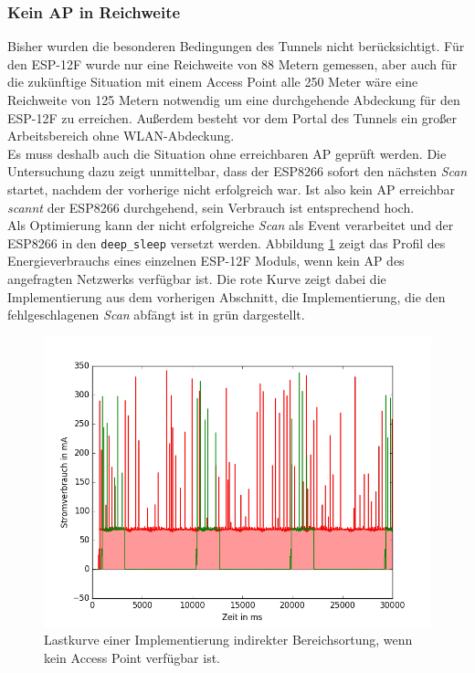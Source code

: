 \subsubsection{Kein AP in Reichweite}
Bisher wurden die besonderen Bedingungen des Tunnels nicht berücksichtigt.
Für den ESP-12F wurde nur eine Reichweite von 88 Metern gemessen, aber auch für die zukünftige Situation mit einem Access Point alle 250 Meter wäre eine Reichweite von 125 Metern notwendig um eine durchgehende Abdeckung für den ESP-12F zu erreichen.
Außerdem besteht vor dem Portal des Tunnels ein großer Arbeitsbereich ohne WLAN-Abdeckung.\\
Es muss deshalb auch die Situation ohne erreichbaren AP geprüft werden.
Die Untersuchung dazu zeigt unmittelbar, dass der ESP8266 sofort den nächsten \emph{Scan} startet, nachdem der vorherige nicht erfolgreich war.
Ist also kein AP erreichbar \emph{scannt} der ESP8266 durchgehend, sein Verbrauch ist entsprechend hoch.\\
Als Optimierung kann der nicht erfolgreiche \emph{Scan} als Event verarbeitet und der ESP8266 in den \texttt{deep\_sleep} versetzt werden.
Abbildung \ref{fig:noap} zeigt das Profil des Energieverbrauchs eines einzelnen ESP-12F Moduls, wenn kein AP des angefragten Netzwerks verfügbar ist.
Die rote Kurve zeigt dabei die Implementierung aus dem vorherigen Abschnitt, die Implementierung, die den fehlgeschlagenen \emph{Scan} abfängt ist in grün dargestellt.

\begin{figure}[h!]
  \centering
	\includegraphics[width=\textwidth]{plots/noap.png}
  \caption{Lastkurve einer Implementierung indirekter Bereichsortung, wenn kein Access Point verfügbar ist.}
  \label{fig:noap}
\end{figure}


